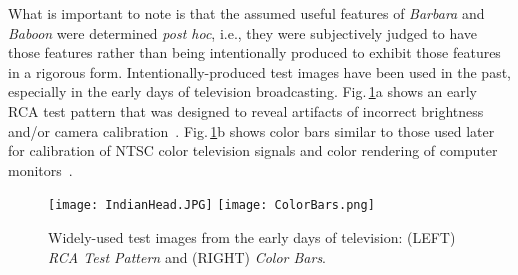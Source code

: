 \documentclass{article}
\begin{document}




What is important to
note is that the assumed useful features of {\em Barbara}
and {\em Baboon} were determined {\em post hoc}, i.e., 
they were subjectively judged to have those features
rather than being intentionally produced to exhibit those
features in a rigorous form. Intentionally-produced test
images have been used in the past, especially in the
early days of television broadcasting. Fig.\,\ref{tv}a shows
an early RCA test pattern that was designed to reveal
artifacts of incorrect brightness and/or camera 
calibration~\cite{RCA}. 
Fig.\,\ref{tv}b shows color bars similar to those used later for
calibration of NTSC color television signals and color
rendering of computer monitors~\cite{Bars}.

\begin{figure}
   \centering
   \texttt{[image: IndianHead.JPG]}\vspace{3pt}
   \texttt{[image: ColorBars.png]}
\caption{Widely-used test images from the early days of television: (LEFT) {\em RCA Test Pattern}  
and  (RIGHT)  {\em Color Bars}.}
\label{tv}
\end{figure}
\end{document}
